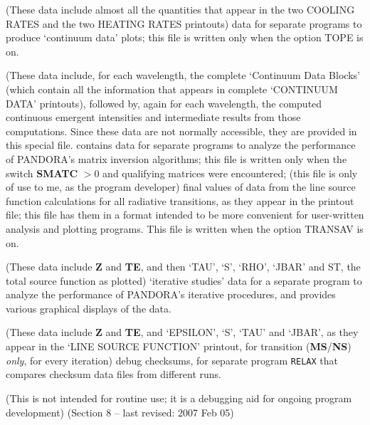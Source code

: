 \spice
\vbox{\parindent=0pt \hangindent=10pt 
(These data include almost all the quantities that appear in the two
COOLING RATES and the two HEATING RATES printouts)}
\blankline
\blankline
{} 
data for separate programs to produce `continuum data' plots;
this file is written only when the option TOPE is on. \par
\spice
\vbox{\parindent=0pt \hangindent=10pt 
(These data include, for each wavelength, the complete `Continuum
Data \break Blocks' (which contain all the information that appears in
complete `CONTINUUM DATA' printouts), followed by, again for each
wavelength, the computed continuous emergent intensities and intermediate
results from those computations. Since these data are not normally 
accessible, they are provided in this special file.}
\ej
{} 
contains data for separate programs to
analyze the performance of PANDORA's matrix inversion algorithms;
this file is written only when the switch {\bf SMATC} $ > 0$ and
qualifying matrices were encountered; (this file is only of use to me,
as the program developer)
\blankline
\blankline
{} 
final values of data from the line source function calculations for
all radiative transitions, as they appear in the printout file; this
file has them in a format intended to be more convenient for 
user-written analysis and plotting programs. This file is written
when the option TRANSAV is on. \par
\spice
\vbox{\parindent=0pt \hangindent=10pt 
(These data include {\bf Z} and {\bf TE}, and then `TAU', `S', `RHO',
`JBAR' and ST, the total source function as plotted)}
\blankline
\blankline
{} 
`iterative studies' data for a separate program to
analyze the performance of PANDORA's iterative
procedures, and provides various graphical displays of the data. \par
\spice
\vbox{\parindent=0pt \hangindent=10pt 
(These data include {\bf Z} and {\bf TE}, and `EPSILON', `S',
`TAU' and `JBAR', as they appear in the `LINE SOURCE FUNCTION' printout,
for transition \break ({\bf MS}/{\bf NS}) {\it only}, for every iteration)}
\blankline
\blankline
{} 
debug checksums, for separate program {\tt RELAX} that compares checksum
data files from different runs. \par
\spice
\vbox{\parindent=0pt \hangindent=10pt 
(This is not intended for routine use; it is a debugging aid for
ongoing program development)}
\blankline
\vfill
\noindent (Section 8 -- last revised: 2007 Feb 05) \par
{}
\ej
